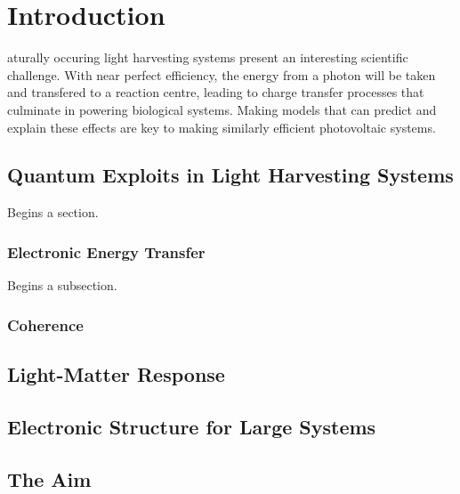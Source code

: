 %
%
\let\textcircled=\pgftextcircled
\chapter{Introduction}
\label{chap:intro}

aturally occuring light harvesting systems present an interesting 
scientific challenge. With near perfect efficiency, the energy from a photon
will be taken and transfered to a reaction centre, leading to charge transfer 
processes that culminate in powering biological systems. Making models that 
can predict and explain these effects are key to making similarly efficient 
photovoltaic systems.

\section{Quantum Exploits in Light Harvesting Systems}
\label{sec:sec01}

Begins a section.

\subsection{Electronic Energy Transfer}
\label{subsec:subsec01}

Begins a subsection.

\subsection{Coherence}
\label{subsec:subsec02}

\section{Light-Matter Response}
\label{sec:sec02}

\section{Electronic Structure for Large Systems}
\label{sec:sec03}

\section{The Aim}
\label{sec:sec04}

